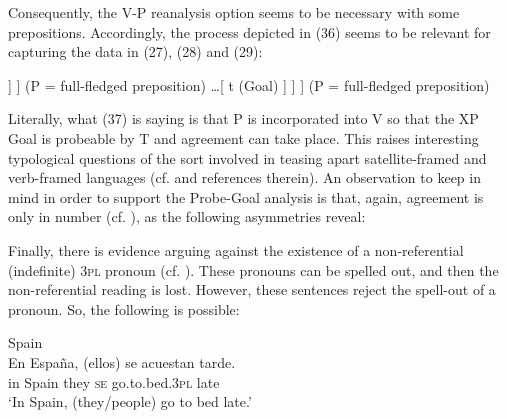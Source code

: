 \documentclass[output=paper]{langsci/langscibook}
\begin{document}
Consequently, the V-P reanalysis option seems to be necessary with some prepositions. Accordingly, the process depicted in (36) seems to be relevant for capturing the data in (27), (28) and (29):


\ea%
    \label{ex:gallego:37}
    \ea\onehalfspacing\relax [ SE \ConnectTail{\textbf{T}} ($\varphi $-Probe)  [\textsubscript{VP} V \ldots\xspace [  P \ConnectHead{\textbf{XP}} (Goal) ] ] ] (P = full-fledged preposition) 
    \ex\onehalfspacing\relax [ SE \ConnectTail{\textbf{T}} ($\varphi $-Probe)  [\textsubscript{VP} [V-P] \ldots\xspace [ t   (Goal) ] ] ] (P = full-fledged preposition)
    \z
\z


Literally, what (37) is saying is that P is incorporated into V so that the XP Goal is probeable by T and agreement can take place. This raises interesting typological questions of the sort involved in teasing apart satellite-framed and verb-framed languages (cf. \citealt{Mateu2012} and references therein). An observation to keep in mind in order to support the Probe-Goal analysis is that, again, agreement is only in number (cf. \citealt{Etxepare2006}), as the following asymmetries reveal:



    \z
    
Finally, there is evidence arguing against the existence of a non-referential (indefinite) \textsc{3pl} pronoun (cf. \citealt{Suñer1983,Cabredo2003}). These pronouns can be spelled out, and then the non-referential reading is lost. However, these sentences reject the spell-out of a pronoun. So, the following is possible:

\ea%
    Spain\label{ex:gallego:39}\\
    \gll En España, (ellos)  se  acuestan            tarde.    \\
         in  Spain       they   \textsc{se} go.to.bed.\textsc{3pl}   late\\
    \glt ‘In Spain, (they/people) go to bed late.’
    \z
\end{document}
